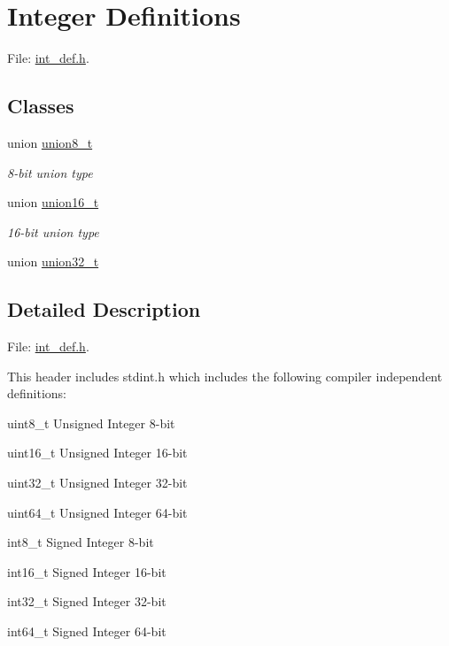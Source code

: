 \hypertarget{group__int__def}{\section{Integer Definitions}
\label{group__int__def}
}


File\+: \hyperlink{int__def_8h_source}{int\+\_\+def.\+h}.  


\subsection*{Classes}
\begin{DoxyCompactItemize}
\item 
union \hyperlink{unionunion8__t}{union8\+\_\+t}
\begin{DoxyCompactList}\small\item\em 8-\/bit union type \end{DoxyCompactList}\item 
union \hyperlink{unionunion16__t}{union16\+\_\+t}
\begin{DoxyCompactList}\small\item\em 16-\/bit union type \end{DoxyCompactList}\item 
union \hyperlink{unionunion32__t}{union32\+\_\+t}
\end{DoxyCompactItemize}


\subsection{Detailed Description}
File\+: \hyperlink{int__def_8h_source}{int\+\_\+def.\+h}. 

This header includes stdint.\+h which includes the following compiler independent definitions\+:
\begin{DoxyItemize}
\item uint8\+\_\+t Unsigned Integer 8-\/bit
\item uint16\+\_\+t Unsigned Integer 16-\/bit
\item uint32\+\_\+t Unsigned Integer 32-\/bit
\item uint64\+\_\+t Unsigned Integer 64-\/bit
\item int8\+\_\+t Signed Integer 8-\/bit
\item int16\+\_\+t Signed Integer 16-\/bit
\item int32\+\_\+t Signed Integer 32-\/bit
\item int64\+\_\+t Signed Integer 64-\/bit
\end{DoxyItemize}

